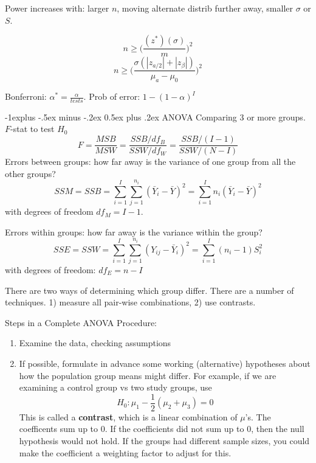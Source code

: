 \documentclass[10pt,landscape]{article}
\makeatletter
\renewcommand{\subsection}{\@startsection{subsection}{2}{0mm}%
                                {-1explus -.5ex minus -.2ex}%
                                {0.5ex plus .2ex}%
                                {\normalfont\normalsize\bfseries}}
\makeatother
\begin{document}
\begin{multicols*}{3}
Power increases with: larger $n$, moving alternate distrib further away, smaller $\sigma$ or $S$.

\[
n \geq \bigg(\frac{ (z^*) (\sigma) } {m}\bigg)^2
\]
\[
n \geq \bigg(\frac{\sigma(|z_{a/2}| + |z_{\beta}|)}{\mu_a - \mu_0}   \bigg)^2
\]

Bonferroni: $\alpha^* = \frac{\alpha}{tests}$. Prob of error: $1 - (1-\alpha)^I$

\subsection{ANOVA}
Comparing 3 or more groups. $F$-stat to test $H_0$
\[
F = \frac{MSB}{MSW} = \frac{SSB/df_B}{SSW/df_W} = \frac {SSB/(I-1)}  {SSW/(N-I)}
\]
Errors between groups: how far away is the variance of one group from all the other groups?
\[
SSM = SSB = \sum_{i=1}^I \sum_{j=1}^{n_i} (\bar{Y}_i - \bar{Y})^2 = \sum_{i=1}^I n_i (\bar{Y}_i - \bar{Y})^2
\]
with degrees of freedom $df_M = I - 1$.

Errors within groups: how far away is the variance within the group?
\[
SSE = SSW = \sum_{i=1}^I \sum_{j=1}^{n_i} (Y_{ij} - \bar{Y}_i)^2 = \sum_{i=1}^I (n_i - 1)S^2_i
\]
with degrees of freedom: $df_E = n - I$

There are two ways of determining which group differ. There are a number of techniques. 1) measure all
pair-wise combinations, 2) use contrasts.

Steps in a Complete ANOVA Procedure:
\begin{enumerate}
\item Examine the data, checking assumptions
\item If possible, formulate in advance some working (alternative)
hypotheses about how the population group means might differ. For example, if we are examining 
a control group vs two study groups, use
\[
H_0 : \mu_1 - \frac{1}{2}(\mu_2 + \mu_3) = 0
\]
This is called a \textbf{contrast}, which is a linear combination of $\mu$'s. The coefficents sum up to 0.
If the coefficients did not sum up to 0, then the null hypothesis would not hold. If the groups had different 
sample sizes, you could make the coefficient a weighting factor to adjust for this.


\end{enumerate}
\end{multicols*}
\end{document}
